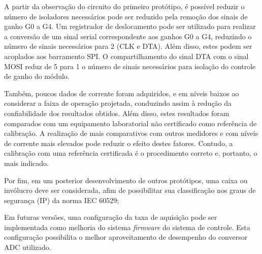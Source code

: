 	A partir da observação do circuito do primeiro protótipo, é possível reduzir o número de isoladores necessários pode ser reduzido pela remoção dos sinais de ganho G0 a G4. Um registrador de deslocamento pode ser utilizado para realizar a conversão de um sinal serial correspondente aos ganhos G0 a G4, reduzindo o número de sinais necessários para 2 (CLK e DTA). Além disso, estes podem ser acoplados aos barramento SPI. O compartilhamento do sinal DTA com o sinal MOSI reduz de 5 para 1 o número de sinais necessários para isolação do controle de ganho do módulo.

	Também, poucos dados de corrente foram adquiridos, e em níveis baixos ao considerar a faixa de operação projetada, conduzindo assim à redução da confiabilidade dos resultados obtidos. Além disso, estes resultados foram comparados com um equipamento laboratorial não certificado como referência de calibração. A realização de mais comparativos com outros medidores e com níveis de corrente mais elevados pode reduzir o efeito destes fatores. Contudo, a calibração com uma referência certificada é o procedimento correto e, portanto, o mais indicado.

	Por fim, em um posterior desenvolvimento de outros protótipos, uma caixa ou invólucro deve ser considerada, afim de possibilitar sua classificação nos graus de segurança (IP) da norma IEC 60529;

	Em futuras versões, uma configuração da taxa de aquisição pode ser implementada como melhoria do sistema \textit{firmware} do sistema de controle. Esta configuração possibilita o melhor aproveitamento de desempenho do conversor ADC utilizado.

